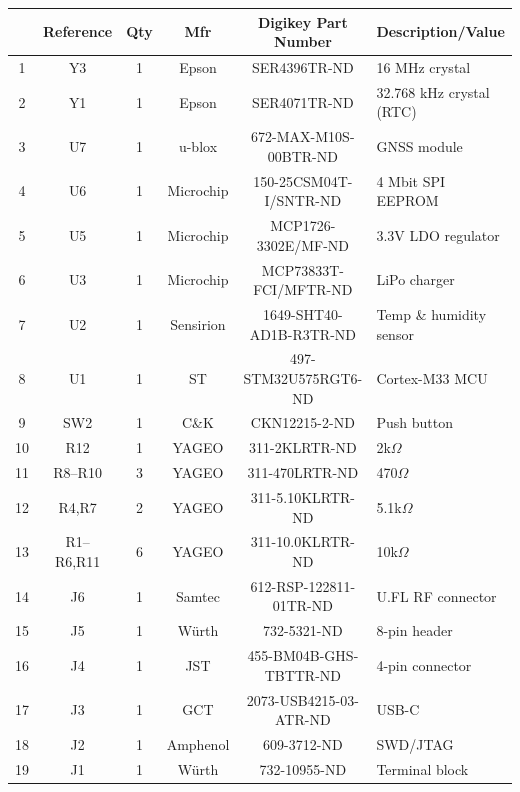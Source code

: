\documentclass[12pt]{article}
\begin{document}
\begin{table}[h!]
\centering
\scriptsize
\setlength{\tabcolsep}{2.5pt}
\renewcommand{\arraystretch}{1.05}

\begin{tabularx}{\textwidth}{|c|c|c|c|c|X|}
\hline

\textbf{\rule{0pt}{3.2ex}\#} & 
\textbf{Reference} & 
\textbf{Qty} & 
\textbf{Mfr} & 
\textbf{Digikey Part Number} & 
\textbf{Description/Value} \\
\hline \hline

1 & Y3 & 1 & Epson & SER4396TR-ND & 16 MHz crystal \\ \hline
2 & Y1 & 1 & Epson & SER4071TR-ND & 32.768 kHz crystal (RTC) \\ \hline

3 & U7 & 1 & u-blox & 672-MAX-M10S-00BTR-ND & GNSS module \\ \hline
4 & U6 & 1 & Microchip & 150-25CSM04T-I/SNTR-ND & 4 Mbit SPI EEPROM \\ \hline
5 & U5 & 1 & Microchip & MCP1726-3302E/MF-ND & 3.3V LDO regulator \\ \hline
6 & U3 & 1 & Microchip & MCP73833T-FCI/MFTR-ND & LiPo charger \\ \hline
7 & U2 & 1 & Sensirion & 1649-SHT40-AD1B-R3TR-ND & Temp \& humidity sensor \\ \hline
8 & U1 & 1 & ST & 497-STM32U575RGT6-ND & Cortex-M33 MCU \\ \hline

9 & SW2 & 1 & C\&K & CKN12215-2-ND & Push button \\ \hline

10 & R12 & 1 & YAGEO & 311-2KLRTR-ND & 2k$\Omega$ \\ \hline
11 & R8--R10 & 3 & YAGEO & 311-470LRTR-ND & 470$\Omega$ \\ \hline
12 & R4,R7 & 2 & YAGEO & 311-5.10KLRTR-ND & 5.1k$\Omega$ \\ \hline
13 & R1--R6,R11 & 6 & YAGEO & 311-10.0KLRTR-ND & 10k$\Omega$ \\ \hline

14 & J6 & 1 & Samtec & 612-RSP-122811-01TR-ND & U.FL RF connector \\ \hline
15 & J5 & 1 & Würth & 732-5321-ND & 8-pin header \\ \hline
16 & J4 & 1 & JST & 455-BM04B-GHS-TBTTR-ND & 4-pin connector \\ \hline
17 & J3 & 1 & GCT & 2073-USB4215-03-ATR-ND & USB-C \\ \hline
18 & J2 & 1 & Amphenol & 609-3712-ND & SWD/JTAG \\ \hline
19 & J1 & 1 & Würth & 732-10955-ND & Terminal block \\ \hline


\end{tabularx}
\end{table}
\end{document}
